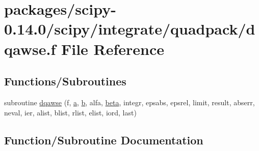 \hypertarget{dqawse_8f}{}\section{packages/scipy-\/0.14.0/scipy/integrate/quadpack/dqawse.f File Reference}
\label{dqawse_8f}
\subsection*{Functions/\+Subroutines}
\begin{DoxyCompactItemize}
\item 
subroutine \hyperlink{dqawse_8f_ab254e22aa7af6d0ed2a839f92362b415}{dqawse} (f, \hyperlink{gen__mat5files_8m_aae328bf20413f220e38aec4d95bfd6da}{a}, \hyperlink{gen__mat5files_8m_a7b38767b3b6a8dae167e5afa4fc340b0}{b}, alfa, \hyperlink{specfun_8f_a4d410ae9b4a4ee1e3bce2ca6c0e57b68}{beta}, integr, epsabs, epsrel, limit, result, abserr, neval, ier, alist, blist, rlist, elist, iord, last)
\end{DoxyCompactItemize}


\subsection{Function/\+Subroutine Documentation}
\hypertarget{dqawse_8f_ab254e22aa7af6d0ed2a839f92362b415}{}
